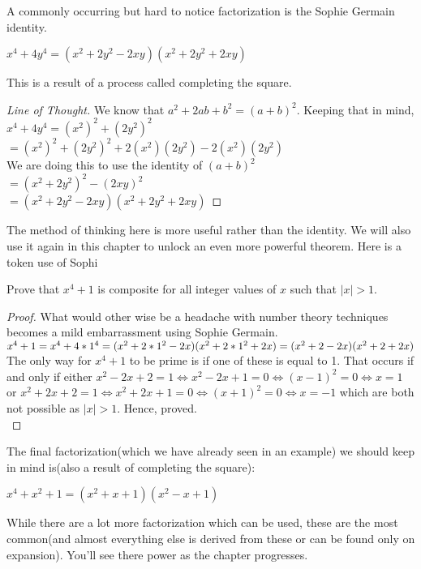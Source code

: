 A commonly occurring but hard to notice factorization is the Sophie Germain identity.
\begin{theorem}
    $x^4+4y^4=(x^2+2y^2-2xy)(x^2+2y^2+2xy)$
\end{theorem}
This is a result of a process called completing the square. \\
\begin{proof}
    [Line of Thought]
    We know that $a^2+2ab+b^2=(a+b)^2$. Keeping that in mind,\\
    $x^4+4y^4=(x^2)^2+(2y^2)^2$\\
    $= (x^2)^2+(2y^2)^2 + 2(x^2)(2y^2)- 2(x^2)(2y^2)$\\
    We are doing this to use the identity of $(a+b)^2$\\
    $=(x^2+2y^2)^2-(2xy)^2$\\
    $=(x^2+2y^2-2xy)(x^2+2y^2+2xy)$
\end{proof}
The method of thinking here is more useful rather than the identity. We will also use it again in this chapter to unlock an even more powerful theorem. Here is a token use of Sophi\\
\begin{example}
    Prove that $x^4+1$ is composite for all integer values of $x$ such that $|x|>1$.
\end{example}
\begin{proof}
    What would other wise be a headache with number theory techniques becomes a mild embarrassment using Sophie Germain.\\
    $x^4+1\\
    = x^4 + 4*1^4\\
    =(x^2+2*1^2-2x)(x^2+2*1^2+2x)\\
    =(x^2+2-2x)(x^2+2+2x)\\$
    The only way for $x^4+1$ to be prime is if one of these is equal to 1. That occurs if and only if either $x^2-2x+2=1 \iff x^2-2x+1=0 \iff (x-1)^2=0 \iff x=1$ or $x^2+2x+2=1 \iff x^2+2x+1=0 \iff (x+1)^2=0 \iff x=-1$ which are both not possible as $|x|>1$. Hence, proved.\\ 
\end{proof}
The final factorization(which we have already seen in an example) we should keep in mind is(also a result of completing the square):
\begin{theorem}
    $x^4+x^2+1=(x^2+x+1)(x^2-x+1)$
\end{theorem}
While there are a lot more factorization which can be used, these are the most common(and almost everything else is derived from these or can be found only on expansion). You'll see there power as the chapter progresses.
